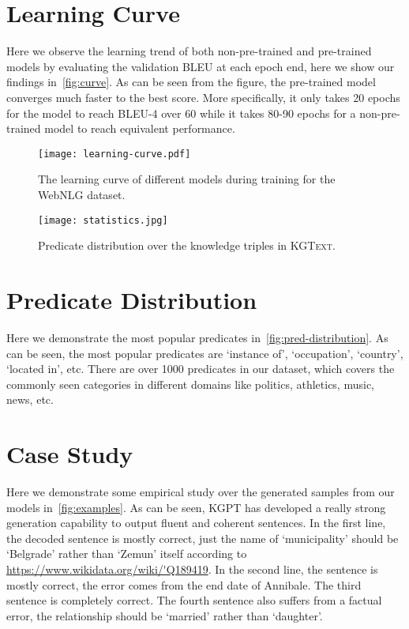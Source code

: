 \documentclass[11pt,a4paper]{article}
\newcommand{\dataset}{\textsc{KGText}\xspace}
\newcommand{\model}{KGPT\xspace}
\begin{document}


\clearpage
\appendix

\section{Learning Curve}
Here we observe the learning trend of both non-pre-trained and pre-trained models by evaluating the validation BLEU at each epoch end, here we show our findings in~\autoref{fig:curve}. As can be seen from the figure, the pre-trained model converges much faster to the best score. More specifically, it only takes 20 epochs for the model to reach BLEU-4 over 60 while it takes 80-90 epochs for a non-pre-trained model to reach equivalent performance.
\begin{figure}[!thb]
    \centering
    \texttt{[image: learning-curve.pdf]}
    \caption{The learning curve of different models during training for the WebNLG dataset. }
    \label{fig:curve}
\end{figure}

\begin{figure*}[!tbh]
    \centering
    \texttt{[image: statistics.jpg]}
    \caption{Predicate distribution over the knowledge triples in \dataset. }
    \label{fig:pred-distribution}
\end{figure*}
\section{Predicate Distribution}
Here we demonstrate the most popular predicates in~\autoref{fig:pred-distribution}. As can be seen, the most popular predicates are `instance of', `occupation', `country', `located in', etc. There are over 1000 predicates in our dataset, which covers the commonly seen categories in different domains like politics, athletics, music, news, etc. 


\section{Case Study}
Here we demonstrate some empirical study over the generated samples from our models in~\autoref{fig:examples}. As can be seen, \model has developed a really strong generation capability to output fluent and coherent sentences. In the first line, the decoded sentence is mostly correct, just the name of `municipality' should be `Belgrade' rather than `Zemun' itself according to \url{https://www.wikidata.org/wiki/'Q189419}. In the second line, the sentence is mostly correct, the error comes from the end date of Annibale. The third sentence is completely correct. The fourth sentence also suffers from a factual error, the relationship should be `married' rather than `daughter'. 
\end{document}
